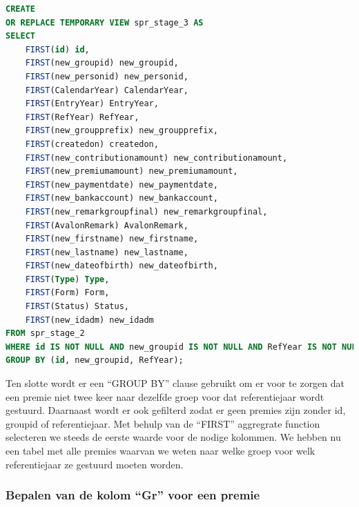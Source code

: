 \begin{lstlisting}[language=SQL, caption={Group by ``id'', ``new\_groupid'' en ``RefYear'' op ``new\_syndicalpremiumrequest''.}, style=myStyle]
CREATE 
OR REPLACE TEMPORARY VIEW spr_stage_3 AS 
SELECT 
    FIRST(id) id, 
    FIRST(new_groupid) new_groupid, 
    FIRST(new_personid) new_personid,
    FIRST(CalendarYear) CalendarYear,
    FIRST(EntryYear) EntryYear,
    FIRST(RefYear) RefYear,
    FIRST(new_groupprefix) new_groupprefix,
    FIRST(createdon) createdon,
    FIRST(new_contributionamount) new_contributionamount,
    FIRST(new_premiumamount) new_premiumamount,
    FIRST(new_paymentdate) new_paymentdate,
    FIRST(new_bankaccount) new_bankaccount,
    FIRST(new_remarkgroupfinal) new_remarkgroupfinal,
    FIRST(AvalonRemark) AvalonRemark,
    FIRST(new_firstname) new_firstname,
    FIRST(new_lastname) new_lastname,
    FIRST(new_dateofbirth) new_dateofbirth,
    FIRST(Type) Type,
    FIRST(Form) Form,
    FIRST(Status) Status,
    FIRST(new_idadm) new_idadm
FROM spr_stage_2 
WHERE id IS NOT NULL AND new_groupid IS NOT NULL AND RefYear IS NOT NULL
GROUP BY (id, new_groupid, RefYear);
\end{lstlisting}

Ten slotte wordt er een ``GROUP BY'' clause gebruikt om er voor te zorgen dat een premie niet twee keer naar dezelfde groep voor dat referentiejaar wordt gestuurd. Daarnaast wordt er ook gefilterd zodat er geen premies zijn zonder id, groupid of referentiejaar. Met behulp van de ``FIRST'' aggregrate function selecteren we steeds de eerste waarde voor de nodige kolommen. We hebben nu een tabel met alle premies waarvan we weten naar welke groep voor welk referentiejaar ze gestuurd moeten worden.

\subsubsection{Bepalen van de kolom ``Gr'' voor een premie}


